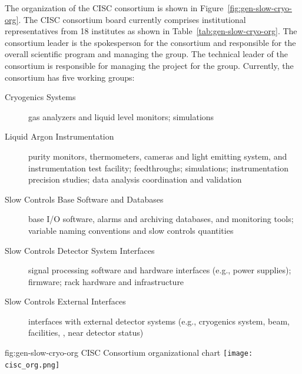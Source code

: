 The organization of the CISC consortium is shown in
 Figure~\ref{fig:gen-slow-cryo-org}. The CISC consortium board currently comprises institutional representatives from 18 institutes as shown in Table~\ref{tab:gen-slow-cryo-org}. The consortium leader is the spokesperson for the consortium and responsible for the overall scientific program and managing the group. The technical leader of the consortium is responsible for managing the project for the group. Currently, the
consortium has five working groups:
\begin{description}
 \item[Cryogenics Systems] gas analyzers and liquid level
  monitors;  simulations
 \item[Liquid Argon Instrumentation] purity monitors, thermometers, cameras and light emitting system, and instrumentation test facility; feedthroughs; \efield simulations; instrumentation precision studies;  data analysis coordination and validation 
 \item [Slow Controls Base Software and Databases]  base I/O software, alarms and archiving databases, and monitoring tools;
   variable naming conventions and slow controls quantities
 \item [Slow Controls Detector System Interfaces] signal processing software and hardware interfaces (e.g., power supplies); firmware; rack hardware and infrastructure   
 \item [Slow Controls External Interfaces] interfaces with external detector systems (e.g., cryogenics system, beam, facilities, , near detector status)
\end{description}

\begin{dunefigure}{fig:gen-slow-cryo-org}
{CISC Consortium organizational chart}
\texttt{[image: cisc\_org.png]}
\end{dunefigure}

